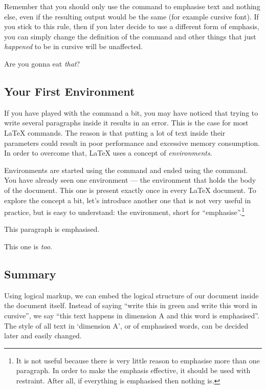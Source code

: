 Remember that you should only use the  command to emphasise text and
nothing else, even if the resulting output would be the same (for example
cursive font). If you stick to this rule, then if you later decide to use a
different form of emphasis, you can simply change the definition of the
 command and other things that just \emph{happened} to be in cursive
will be unaffected.
\begin{example}
  \RenewCommandCopy{\emph}{\strong}%
Are you gonna eat \emph{that}?
\end{example}

\subsection{Your First Environment}

If you have played with the  command a bit, you may have noticed that
trying to write several paragraphs inside it results in an error. This is the
case for most \LaTeX{} commands. The reason is that putting a lot of
text inside their parameters could result in poor performance and excessive
memory consumption. In order to overcome that, \LaTeX{} uses a concept of
\emph{environments}.

Environments are started using the  command and ended using the
 command. You have already seen one environment --- the
 environment that holds the body of the document. This one is
present exactly once in every \LaTeX{} document. To explore the concept a bit,
let's introduce another one that is not very useful in practice, but is easy to
understand: the  environment, short for
\enquote{emphasise}.\footnote{It is not useful because there is very little
  reason to emphasise more than one paragraph. In order to make the emphasis
  effective, it should be used with restraint. After all, if everything is
  emphasised then nothing is.}
\begin{example}
\begin{em}
  This paragraph is emphasised.

  This one is \emph{too}.
\end{em}
\end{example}

\subsection{Summary}

Using logical markup, we can embed the logical structure of our document inside
the document itself. Instead of saying \enquote{write this in green and write
  this word in cursive}, we say \enquote{this text happens in dimension A and
  this word is emphasised}. The style of all text in \enquote*{dimension A},
or of emphasised words, can be decided later and easily changed.

